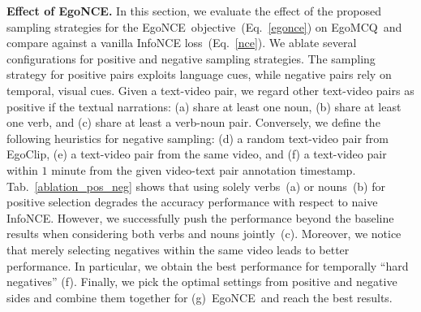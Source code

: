 \documentclass{article}
\newcommand{\dataset}{EgoClip}
\newcommand{\model}{EgoNCE\xspace}
\newcommand{\eval}{EgoMCQ}
\begin{document}
\textbf{Effect of \model.}
In this section, we evaluate the effect of the proposed sampling strategies for the \model~objective~(Eq.~\ref{egonce}) on \eval~and compare against a vanilla InfoNCE loss~(Eq.~\ref{nce}). We ablate several configurations for positive and negative sampling strategies. 
The sampling strategy for positive pairs exploits language cues, while negative pairs rely on temporal, visual cues.
Given a text-video pair, we regard other text-video pairs as positive if the textual narrations: 
(a) share at least one noun, 
(b) share at least one verb, and (c) share at least a verb-noun pair. 
Conversely, we define the following heuristics for negative sampling: 
(d) a random text-video pair from \dataset, 
(e) a text-video pair from the same video, and
(f) a text-video pair within $1$ minute from the given video-text pair annotation timestamp. 
Tab.~\ref{ablation_pos_neg} shows that using solely verbs~(a) or nouns~(b) for positive selection degrades the accuracy performance with respect to naive InfoNCE. However, we successfully push the performance beyond the baseline results when considering both verbs and nouns jointly~(c). 
Moreover, we notice that merely selecting negatives within the same video leads to better performance. In particular, we obtain the best performance for temporally ``hard negatives'' (f).
Finally, we pick the optimal settings from positive and negative sides and combine them together for (g)~\model~and reach the best results.
\end{document}
